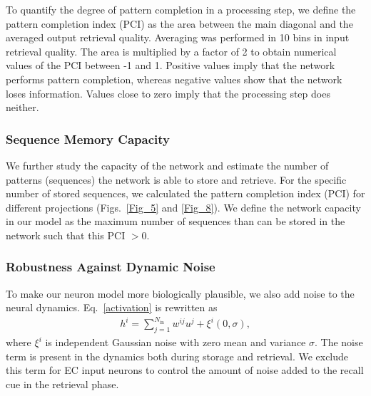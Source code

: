 \documentclass[utf8]{frontiersSCNS} %
\begin{document}
To quantify the degree of pattern completion in a processing step, we define the pattern completion index (PCI) as the area between the main diagonal and the averaged output retrieval quality. Averaging was performed in 10 bins in input retrieval quality. The area is multiplied by a factor of 2 to obtain numerical values of the PCI between -1 and 1. Positive values imply that the network performs pattern completion, whereas negative values show that the network loses information. Values close to zero imply that the processing step does neither. 

\subsubsection*{Sequence Memory Capacity}

We further study the capacity of the network and estimate the number of patterns (sequences) the network is able to store and retrieve. For the specific number of stored sequences, we calculated the pattern completion index (PCI) for different projections (Figs.~\ref{Fig_5} and \ref{Fig_8}). 
We define the network capacity in our model as the maximum number of sequences than can be stored in the network such that this PCI $> 0$.

\subsubsection*{Robustness Against Dynamic Noise}

To make our neuron model more biologically plausible, we also add noise to the neural dynamics. Eq.~\ref{activation} is rewritten as
\begin{align}
\label{dynamic-noise}
h^i = \sum_{j=1}^{N_\mathrm{in}} w^{ij}u^j + \xi ^i (0,\sigma),
\end{align}  
where $\xi^i$ is independent Gaussian noise with zero mean and variance $\sigma$. The noise term is present in the dynamics both during storage and retrieval. We exclude this term for EC input neurons to control the amount of noise added to the recall cue in the retrieval phase.


\end{document}
